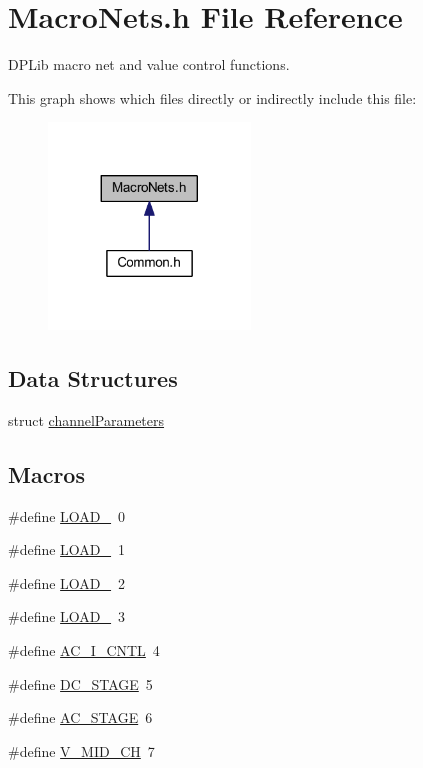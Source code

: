 \hypertarget{a00021}{\section{Macro\-Nets.\-h File Reference}
\label{a00021}
}


D\-P\-Lib macro net and value control functions.  


This graph shows which files directly or indirectly include this file\-:
\nopagebreak
\begin{figure}[H]
\begin{center}
\leavevmode
\includegraphics[width=152pt]{a00050}
\end{center}
\end{figure}
\subsection*{Data Structures}
\begin{DoxyCompactItemize}
\item 
struct \hyperlink{a00003}{channel\-Parameters}
\end{DoxyCompactItemize}
\subsection*{Macros}
\begin{DoxyCompactItemize}
\item 
\#define \hyperlink{a00021_a007a209cd2e2b935be1f69218652edc1}{L\-O\-A\-D\-\_}~0
\item 
\#define \hyperlink{a00021_a363f09c63f2ecb9086b47d72a3f3f57d}{L\-O\-A\-D\-\_}~1
\item 
\#define \hyperlink{a00021_af7c1e96216e7b48160e5a03afe8ac807}{L\-O\-A\-D\-\_}~2
\item 
\#define \hyperlink{a00021_a2c862ec4115c4a016b61800609f236a7}{L\-O\-A\-D\-\_}~3
\item 
\#define \hyperlink{a00021_ab875424e7a295e6a0eae1605b3285adb}{A\-C\-\_\-\-I\-\_\-\-C\-N\-T\-L}~4
\item 
\#define \hyperlink{a00021_af3967a451ed4068ca1cbf55dd2de3799}{D\-C\-\_\-\-S\-T\-A\-G\-E}~5
\item 
\#define \hyperlink{a00021_a3fc4318ae73eae35339f616047300b0f}{A\-C\-\_\-\-S\-T\-A\-G\-E}~6
\item 
\#define \hyperlink{a00021_a1ae2d3caef45c64fbb9175c50c27ce09}{V\-\_\-\-M\-I\-D\-\_\-\-C\-H}~7
\end{DoxyCompactItemize}
